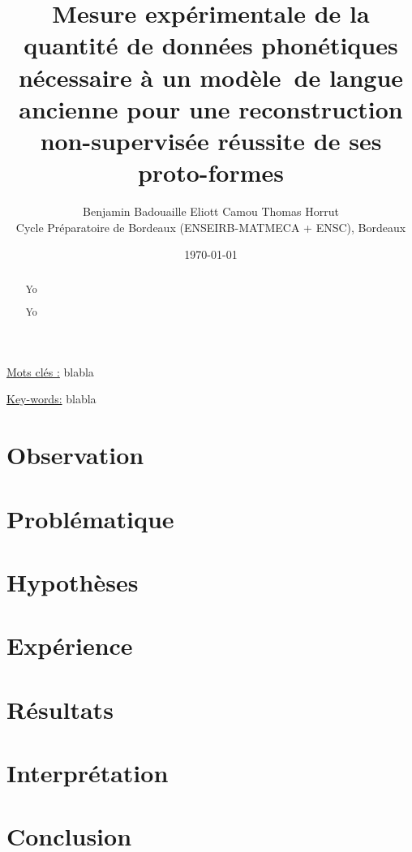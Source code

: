 \documentclass[11pt, french]{article}
\title{Mesure expérimentale de la quantité de données phonétiques nécessaire à un modèle\
de langue ancienne pour une reconstruction non-supervisée réussite de ses proto-formes}
\author{Benjamin Badouaille \qquad Eliott Camou \qquad Thomas Horrut \\
    Cycle Préparatoire de Bordeaux (ENSEIRB-MATMECA + ENSC), Bordeaux}
\date{\today}
\begin{document}
\maketitle
\begin{abstract}
    Yo
\end{abstract}
\underline{Mots clés :} blabla
\begin{abstract}
  Yo
\end{abstract}
\underline{Key-words:} blabla
\renewcommand*\contentsname{Sommaire}
\tableofcontents

\section{Observation}

\blindtext


\section{Problématique}

\section{Hypothèses}

\section{Expérience}

\section{Résultats}

\section{Interprétation}
\section{Conclusion}
\end{document}
